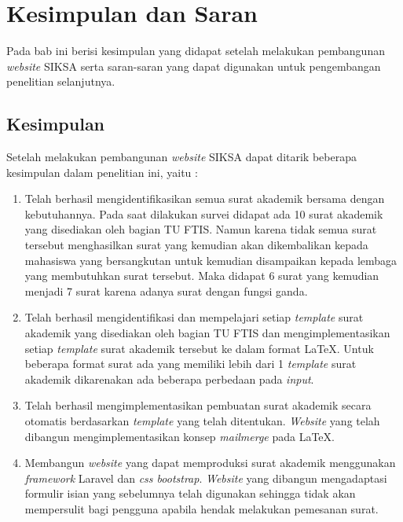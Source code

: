 \chapter{Kesimpulan dan Saran}
\label{chap:kesimpulan_dan_saran}

Pada bab ini berisi kesimpulan yang didapat setelah melakukan pembangunan \textit{website} SIKSA serta saran-saran yang dapat digunakan untuk pengembangan penelitian selanjutnya.

\section{Kesimpulan}
\label{sec:kesimpulan}
Setelah melakukan pembangunan \textit{website} SIKSA dapat ditarik beberapa kesimpulan dalam penelitian ini, yaitu :
\begin{enumerate}
	\item Telah berhasil mengidentifikasikan semua surat akademik bersama dengan kebutuhannya. Pada saat dilakukan survei didapat ada 10 surat akademik yang disediakan oleh bagian TU FTIS. Namun karena tidak semua surat tersebut menghasilkan surat yang kemudian akan dikembalikan kepada mahasiswa yang bersangkutan untuk kemudian disampaikan kepada lembaga yang membutuhkan surat tersebut. Maka didapat 6 surat yang kemudian menjadi 7 surat karena adanya surat dengan fungsi ganda.
	\item Telah berhasil mengidentifikasi dan mempelajari setiap \textit{template} surat akademik yang disediakan oleh bagian TU FTIS dan mengimplementasikan setiap \textit{template} surat akademik tersebut ke dalam format \LaTeX. Untuk beberapa format surat ada yang memiliki lebih dari 1 \textit{template} surat akademik dikarenakan ada beberapa perbedaan pada \textit{input}.
	\item Telah berhasil mengimplementasikan pembuatan surat akademik secara otomatis berdasarkan \textit{template} yang telah ditentukan. \textit{Website} yang telah dibangun mengimplementasikan konsep \textit{mailmerge} pada \LaTeX.
	\item Membangun \textit{website} yang dapat memproduksi surat akademik menggunakan \textit{framework} Laravel dan \textit{css bootstrap}. \textit{Website} yang dibangun mengadaptasi formulir isian yang sebelumnya telah digunakan sehingga tidak akan mempersulit bagi pengguna apabila hendak melakukan pemesanan surat.

\end{enumerate}


